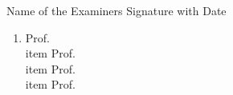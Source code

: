 \documentclass{article}
\begin{document}
\begin{titlingpage}
\begin{table}[h!]
\begin{tabular}{cccccccccc}
\end{tabular}

\end{table}
Name of the Examiners    \hfill      Signature with Date
\begin{small}
\begin{enumerate}\item Prof.
\\item Prof.
\\item Prof.
\\item Prof.
\end{enumerate}
\end{small}


\end{titlingpage}
\end{document}
